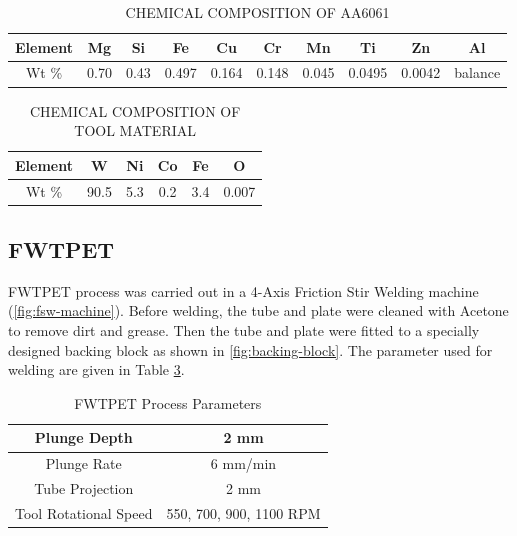 \documentclass[3p]{elsarticle}
\begin{document}
\begin{table}[!htbp]
\caption{CHEMICAL COMPOSITION OF AA6061}
\centering
\begin{tabular}{|c|c|c|c|c|c|c|c|c|c|}
\hline 
Element & Mg & Si & Fe & Cu & Cr & Mn & Ti & Zn & Al\\ 
\hline 
Wt \% & 0.70 & 0.43 & 0.497 & 0.164 & 0.148 & 0.045 & 0.0495 & 0.0042 & balance\\ 
\hline 
\end{tabular}
\label{table:AA6061-composition} %
\end{table}

\begin{table}[!htbp]
\caption{CHEMICAL COMPOSITION OF TOOL MATERIAL}
\centering
\begin{tabular}{|c|c|c|c|c|c|}
\hline 
Element & W & Ni & Co & Fe & O \\ 
\hline 
Wt \% & 90.5 & 5.3 & 0.2 & 3.4 & 0.007 \\ 
\hline 
\end{tabular}
\label{table:tool-composition} %
\end{table}

\subsection{FWTPET}
\label{subsec:FWTPET}
FWTPET process was carried out in a 4-Axis Friction Stir Welding machine (\ref{fig:fsw-machine}). Before welding, the tube and plate were cleaned with Acetone to remove dirt and grease. Then the tube and plate were fitted to a specially designed backing block as shown in \ref{fig:backing-block}. The parameter used for welding are given in Table \ref{table:process-parameters}. %

\begin{table}[!htbp]
\caption{FWTPET Process Parameters}
\centering
\begin{tabular}{|c|c|}
\hline 
Plunge Depth & 2 mm \\ 
\hline 
Plunge Rate & 6 mm/min \\ 
\hline 
Tube Projection & 2 mm \\ 
\hline 
Tool Rotational Speed & 550, 700, 900, 1100 RPM \\ 
\hline 
\end{tabular} 
\label{table:process-parameters} %
\end{table}
\end{document}
